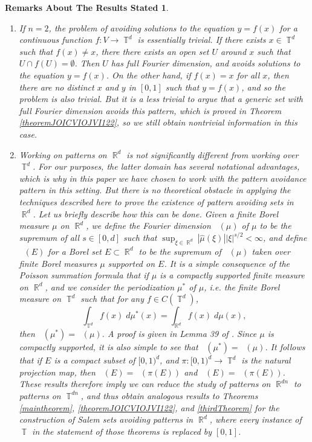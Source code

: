 \documentclass[dvipsnames,letterpaper,12pt]{article}
\numberwithin{equation}{section}
\DeclareMathOperator{\hausdim}{\dim_{\mathbb{H}}}
\DeclareMathOperator{\fordim}{\dim_{\mathbb{F}}}
\DeclareMathOperator{\RR}{\mathbb{R}}
\DeclareMathOperator{\TT}{\mathbb{T}}
\newtheorem*{remarksaboutresults}{Remarks About The Results Stated}
\numberwithin{theorem}{section}
\begin{document}
\begin{remarksaboutresults}
\begin{enumerate}
        \item If $n = 2$, the problem of avoiding solutions to the equation $y = f(x)$ for a continuous function $f: V \to \TT^d$ is essentially trivial. If there exists $x \in \TT^d$ such that $f(x) \neq x$, there there exists an open set $U$ around $x$ such that $U \cap f(U) = \emptyset$. Then $U$ has full Fourier dimension, and avoids solutions to the equation $y = f(x)$. On the other hand, if $f(x) = x$ for all $x$, then there are no distinct $x$ and $y$ in $[0,1]$ such that $y = f(x)$, and so the problem is also trivial. But it is a less trivial to argue that a \emph{generic} set with full Fourier dimension avoids this pattern, which is proved in Theorem \ref{theoremJOICVIOJVI122}, so we still obtain nontrivial information in this case.

        \item Working on patterns on $\RR^d$ is not significantly different from working over $\TT^d$. For our purposes, the latter domain has several notational advantages, which is why in this paper we have chosen to work with the pattern avoidance pattern in this setting. But there is no theoretical obstacle in applying the techniques described here to prove the existence of pattern avoiding sets in $\RR^d$. Let us briefly describe how this can be done. Given a finite Borel measure $\mu$ on $\RR^d$, we define the Fourier dimension $\fordim(\mu)$ of $\mu$ to be the supremum of all $s \in [0,d]$ such that $\sup_{\xi \in \RR^d} |\widehat{\mu}(\xi)| |\xi|^{s/2} < \infty$, and define $\fordim(E)$ for a Borel set $E \subset \RR^d$ to be the supremum of $\fordim(\mu)$ taken over finite Borel measures $\mu$ supported on $E$. It is a simple consequence of the Poisson summation formula that if $\mu$ is a compactly supported finite measure on $\RR^d$, and we consider the \emph{periodization} $\mu^*$ of $\mu$, i.e. the finite Borel measure on $\TT^d$ such that for any $f \in C(\TT^d)$,
    \begin{equation}
        \int_{\TT^d} f(x)\; d\mu^*(x) = \int_{\RR^d} f(x)\; d\mu(x),
    \end{equation}
    then $\fordim(\mu^*) = \fordim(\mu)$. A proof is given in Lemma 39 of \cite{MyThesis}. Since $\mu$ is compactly supported, it is also simple to see that $\hausdim(\mu^*) = \hausdim(\mu)$. It follows that if $E$ is a compact subset of $[0,1)^d$, and $\pi: [0,1)^d \to \TT^d$ is the natural projection map, then $\fordim(E) = \fordim(\pi(E))$ and $\hausdim(E) = \hausdim(\pi(E))$. These results therefore imply we can reduce the study of patterns on $\RR^{dn}$ to patterns on $\TT^{dn}$, and thus obtain analogous results to Theorems \ref{maintheorem}, \ref{theoremJOICVIOJVI122}, and \ref{thirdTheorem} for the construction of Salem sets avoiding patterns in $\RR^d$, where every instance of $\TT$ in the statement of those theorems is replaced by $[0,1]$.
    \end{enumerate}
\end{remarksaboutresults}
\end{document}
